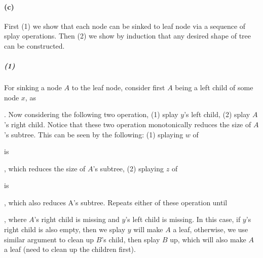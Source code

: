 \documentclass[10pt,letter]{article}
\begin{document}
\paragraph{(c)} 
First (1) we show that each node can be sinked to leaf node via a sequence of splay operations. Then (2) we show by induction that any desired shape of tree can be constructed.
\subparagraph{(1)}For sinking a node $A$ to the leaf node, consider first $A$ being a left child of some node $x$, as . Now considering the following two operation, (1) splay $y$'s left child, (2) splay $A$'s right child. Notice that these two operation monotonically reduces the size of $A$'s subtree. This can be seen by the following: (1) splaying $w$ of  is , which reduces the size of $A$'s subtree, (2) splaying $z$ of  is , which also reduces A's subtree. Repeats either of these operation until , where $A$'s right child is missing and $y$'s left child is missing. In this case, if $y$'s right child is also empty, then we splay $y$ will make $A$ a leaf, otherwise, we use similar argument to clean up $B$'s child, then splay $B$ up, which will also make $A$ a leaf (need to clean up the children first).
\end{document}
